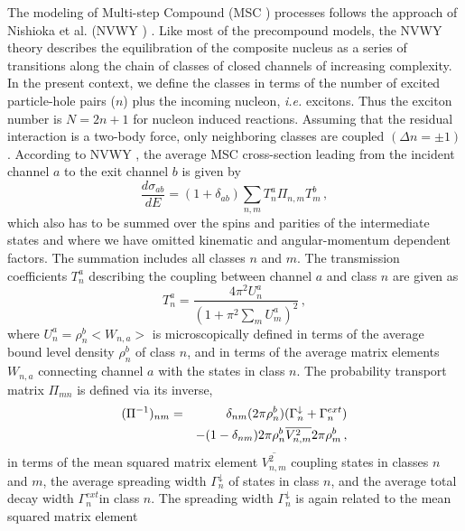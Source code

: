 The modeling of Multi-step Compound%
 (MSC%
) processes follows the approach of Nishioka et al. (NVWY%
) \cite{NVWY}. Like most of the precompound models, the NVWY
theory describes the equilibration of the composite nucleus as a series of
transitions along the chain of classes of closed channels of increasing
complexity. In the present context, we define the classes in terms of the
number of excited particle-hole pairs ($n$) plus the incoming nucleon,
\textit{i.e.} excitons. Thus the exciton number is $N=2n+1$ for nucleon
induced reactions. Assuming that the residual interaction is a two-body
force, only neighboring classes are coupled $(\Delta n=\pm1)$. According to
NVWY%
, the average MSC%
 cross-section leading from the incident channel $a$ to the exit
channel $b$ is given by
\begin{equation}
\frac{d\sigma_{ab}}{dE}=(1+\delta_{ab})\sum_{n,m}T_{n}^{a}\Pi_{n,m}T_{m}^{b}%
\,,  \label{msccs}
\end{equation}
which also has to be summed over the spins and parities of the intermediate
states and where we have omitted kinematic and angular-momentum dependent
factors. The summation includes all classes $n$ and $m$. The transmission
coefficients $T_{n}^{a}$ describing the coupling between channel $a$ and
class $n$ are given as
\begin{equation}
T_{n}^{a}=\frac{4\pi^{2}U_{n}^{a}}{\left(1+\pi^{2}\sum_{m}U_{m}^{a}%
\right)^{2}}\,,  \label{TlMSC}
\end{equation}
\noindent where $U_{n}^{a}=\rho_{n}^{b}<W_{n,a}>$ is microscopically defined
in terms of the average bound level density%
 $\rho_{n}^{b}$ of class $n$, and in terms of the
average matrix elements $W_{n,a}$ connecting channel $a$ with the states in
class $n$. The probability transport matrix $\Pi_{mn}$ is defined via its
inverse,
\begin{eqnarray}
(\Pi^{-1})_{nm}&=&\delta_{nm}(2\pi\rho_{n}^{b})(\Gamma_{n}^{\downarrow}+%
\Gamma_{n}^{ext})  \notag \\
&&-(1-\delta_{nm})2\pi\rho_{n}^{b}%
\overline{V_{n,m}^{2}}2\pi\rho_{m}^{b}\,,  \label{Pi}
\end{eqnarray}
in terms of the mean squared matrix element $\overline{V_{n,m}^{2}}$
coupling states in classes $n$ and $m$, the average spreading width $%
\Gamma_{n}^{\downarrow}$ of states in class $n$, and the average total decay
width $\Gamma_{n}^{ext}$in class $n$. The spreading width $%
\Gamma_{n}^{\downarrow}$ is again related to the mean squared matrix element

